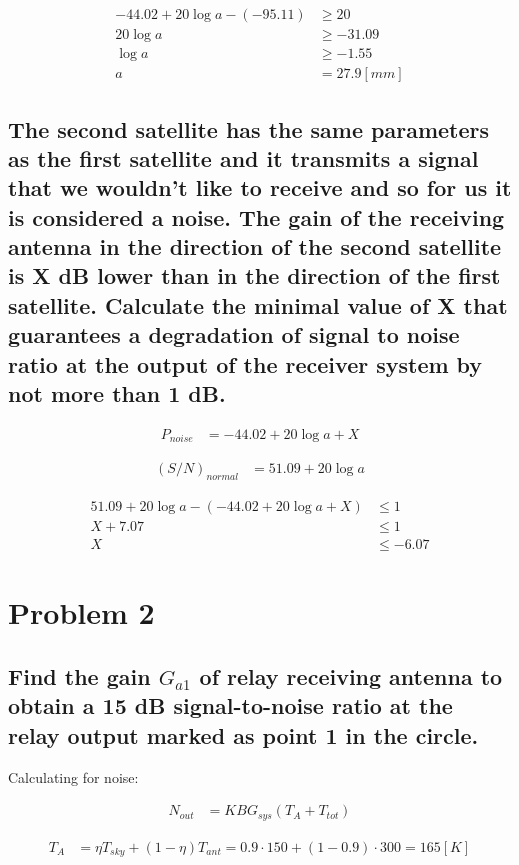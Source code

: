 \documentclass[12pt, letterpaper]{article}
\begin{document}
\begin{align}
  -44.02+20\log a
  - (-95.11)&\ge 20
  \\
  20\log a
  &\ge
  -31.09
  \\
  \log a
  &\ge
  -1.55
  \\
  a
  &=
  27.9[mm]
\end{align}

\subsection{The second satellite has the same parameters as the first satellite and it transmits a signal that we wouldn't like to receive and so for us it is considered a noise. The gain of the receiving antenna in the direction of the second satellite is X dB lower than in the direction of the first satellite. Calculate the minimal value of X that guarantees a degradation of signal to noise ratio at the output of the receiver system by not more than 1 dB.}

\begin{align}
  P_{noise}
  &=
  -44.02+20\log a+X
\end{align}

\begin{align}
  (S/N)_{normal}&=51.09+20\log a
\end{align}

\begin{align}
  51.09+20\log a-(-44.02+20\log a+X)
  &\le
  1
  \\
  X+7.07
  &\le
  1
  \\
  X
  &\le
  -6.07
\end{align}

\section*{Problem 2}

\subsection{Find the gain $G_{a1}$ of relay receiving antenna to obtain a 15 dB signal-to-noise ratio at the relay output marked as point 1 in the circle.}

Calculating for noise:


\begin{align}
  N_{out}
  &=
  KBG_{sys}(T_A+T_{tot})
\end{align}

\begin{align}
  T_A
  &=
  \eta T_{sky}
  +
  (1-\eta)T_{ant}
  =
  0.9\cdot150
  +
  (1-0.9)\cdot 300
  =
  165[K]
\end{align}
\end{document}
